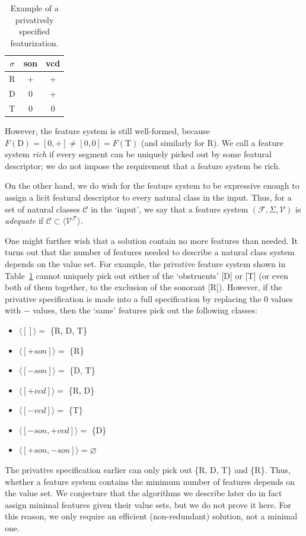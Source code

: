 \documentclass[11pt, oneside]{article}   	%
\begin{document}
\begin{table}[h]
    \centering
    \begin{tabular} {|c||c|c|}
    \hline
        $\sigma$ & son & vcd \\ \hline
        R & + & + \\
        D & 0 & + \\
        T & 0 & 0 \\
        \hline
    \end{tabular}
    \caption{Example of a privatively specified featurization.}
    \label{table:privative}
\end{table}

\noindent However, the feature system is still well-formed, because $F(\text{D}) = [0, +] \neq [0, 0] = F(\text{T})$ (and similarly for R). We call a feature system \textit{rich} if every segment can be uniquely picked out by some featural descriptor; we do not impose the requirement that a feature system be rich.

On the other hand, we do wish for the feature system to be expressive enough to assign a licit featural  descriptor to every natural class in the input. Thus, for a set of natural classes $\mathcal C$ in the `input', we say that a feature system $(\mathcal F, \Sigma, \mathcal V)$ is \textit{adequate} if $\mathcal C \subset \langle \mathcal V^\mathcal F \rangle$.

One might further wish that a solution contain no more features than needed. It turns out that the number of features needed to describe a natural class system depends on the value set. For example, the privative feature system shown in Table~\ref{table:privative} cannot uniquely pick out either of the `obstruents' [D] or [T] (or even both of them together, to the exclusion of the sonorant [R]). However, if the privative specification is made into a full specification by replacing the $0$ values with $-$ values, then the `same' features pick out the following classes: \begin{itemize}
    \item $\langle [] \rangle =$ \{R, D, T\}
    \item $\langle [+son] \rangle =$ \{R\}
    \item $\langle [-son] \rangle =$ \{D, T\}
    \item $\langle [+vcd] \rangle =$ \{R, D\}
    \item $\langle [-vcd] \rangle =$ \{T\}
    \item $\langle [-son,+vcd] \rangle =$ \{D\}
    \item $\langle [+son,-son] \rangle = \varnothing$
    \end{itemize}
The privative specification earlier can only pick out \{R, D, T\} and \{R\}. Thus, whether a feature system contains the minimum number of features depends on the value set. We conjecture that the algorithms we describe later do in fact assign minimal features given their value sets, but we do not prove it here. For this reason, we only require an efficient (non-redundant) solution, not a minimal one.
\end{document}
